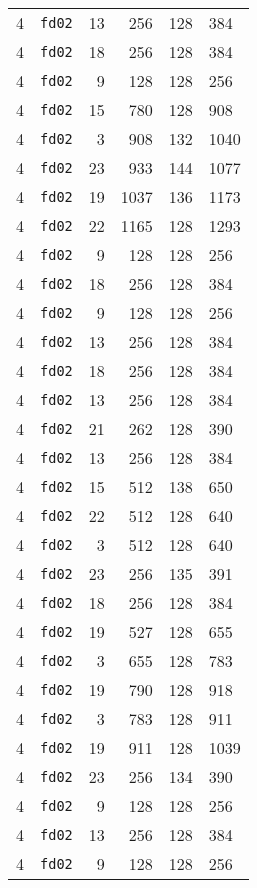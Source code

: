 \documentclass{article}
\begin{document}
\begin{table}[h!]
\begin{tabular}{llrrrl}
    4 & \texttt{fd02} & 13 & 256 & 128 & 384 \\
    4 & \texttt{fd02} & 18 & 256 & 128 & 384 \\
    4 & \texttt{fd02} & 9 & 128 & 128 & 256 \\
    4 & \texttt{fd02} & 15 & 780 & 128 & 908 \\
    4 & \texttt{fd02} & 3 & 908 & 132 & 1040 \\
    4 & \texttt{fd02} & 23 & 933 & 144 & 1077 \\
    4 & \texttt{fd02} & 19 & 1037 & 136 & 1173 \\
    4 & \texttt{fd02} & 22 & 1165 & 128 & 1293 \\
    4 & \texttt{fd02} & 9 & 128 & 128 & 256 \\
    4 & \texttt{fd02} & 18 & 256 & 128 & 384 \\
    4 & \texttt{fd02} & 9 & 128 & 128 & 256 \\
    4 & \texttt{fd02} & 13 & 256 & 128 & 384 \\
    4 & \texttt{fd02} & 18 & 256 & 128 & 384 \\
    4 & \texttt{fd02} & 13 & 256 & 128 & 384 \\
    4 & \texttt{fd02} & 21 & 262 & 128 & 390 \\
    4 & \texttt{fd02} & 13 & 256 & 128 & 384 \\
    4 & \texttt{fd02} & 15 & 512 & 138 & 650 \\
    4 & \texttt{fd02} & 22 & 512 & 128 & 640 \\
    4 & \texttt{fd02} & 3 & 512 & 128 & 640 \\
    4 & \texttt{fd02} & 23 & 256 & 135 & 391 \\
    4 & \texttt{fd02} & 18 & 256 & 128 & 384 \\
    4 & \texttt{fd02} & 19 & 527 & 128 & 655 \\
    4 & \texttt{fd02} & 3 & 655 & 128 & 783 \\
    4 & \texttt{fd02} & 19 & 790 & 128 & 918 \\
    4 & \texttt{fd02} & 3 & 783 & 128 & 911 \\
    4 & \texttt{fd02} & 19 & 911 & 128 & 1039 \\
    4 & \texttt{fd02} & 23 & 256 & 134 & 390 \\
    4 & \texttt{fd02} & 9 & 128 & 128 & 256 \\
    4 & \texttt{fd02} & 13 & 256 & 128 & 384 \\
    4 & \texttt{fd02} & 9 & 128 & 128 & 256 \\

\end{tabular}
\end{table}
\end{document}
